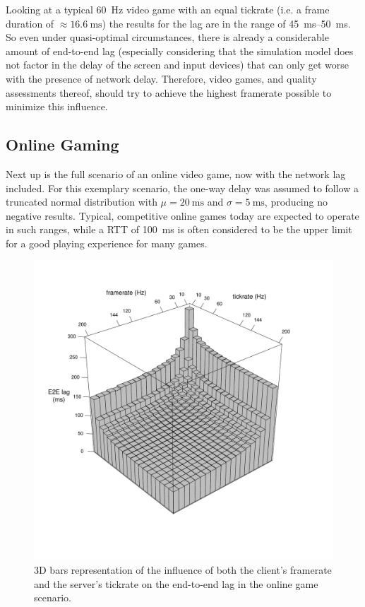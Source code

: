 Looking at a typical \SI{60}{\hertz} video game with an equal tickrate (i.e. a frame duration of $\approx \SI{16.6}{\milli\second}$) the results for the lag are in the range of \SIrange{45}{50}{\milli\second}. So even under quasi-optimal circumstances, there is already a considerable amount of end-to-end lag (especially considering that the simulation model does not factor in the delay of the screen and input devices) that can only get worse with the presence of network delay. Therefore, video games, and quality assessments thereof, should try to achieve the highest framerate possible to minimize this influence.

\subsection{Online Gaming}

Next up is the full scenario of an online video game, now with the network lag included. For this exemplary scenario, the one-way delay was assumed to follow a truncated normal distribution with $\mu = \SI{20}{\milli\second}$ and $\sigma = \SI{5}{\milli\second}$, producing no negative results. Typical, competitive online games today are expected to operate in such ranges, while a \acrshort{RTT} of \SI{100}{\milli\second} is often considered to be the upper limit for a good playing experience for many games.

\begin{figure}[!t]
	\centering
	\includegraphics[width=1.0\columnwidth]{../simulation/visualization/e2e-lag-3dbars.pdf}
	\vspace{-15mm}
	\caption{3D bars representation of the influence of both the client's framerate and the server's tickrate on the end-to-end lag in the online game scenario.}
\label{fig:3dbars-framerate-tickrate-lag}
\end{figure}

